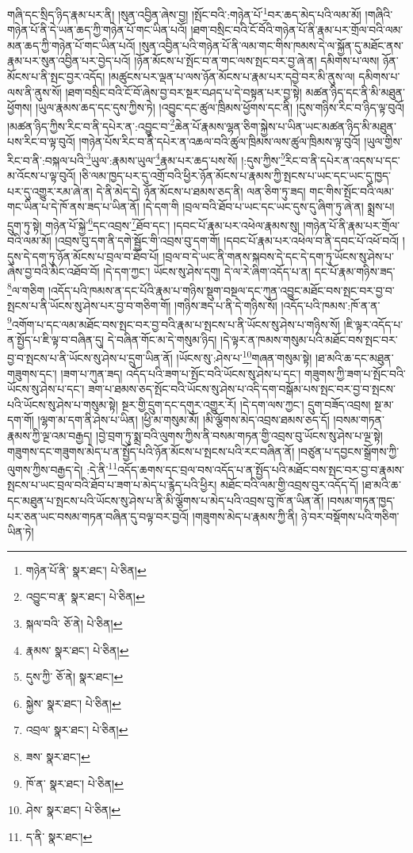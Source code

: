 གཞི་དང་སྲིད་ཉིད་རྣམ་པར་ནི། །སུན་འབྱིན་ཞེས་བྱ། །སྤོང་བའི་:གཉེན་པོ་\footnote{གཉེན་པོ་ནི་  སྣར་ཐང་།  པེ་ཅིན། }བར་ཆད་མེད་པའི་ལམ་མོ། །གཞིའི་གཉེན་པོ་ནི་དེ་ཡན་ཆད་ཀྱི་གཉེན་པོ་གང་ཡིན་པའོ། །ཐག་བསྲིང་བའི་ངོ་བོའི་གཉེན་པོ་ནི་རྣམ་པར་གྲོལ་བའི་ལམ་མན་ཆད་ཀྱི་གཉེན་པོ་གང་ཡིན་པའོ། །སུན་འབྱིན་པའི་གཉེན་པོ་ནི་ལམ་གང་གིས་ཁམས་དེ་ལ་སྐྱོན་དུ་མཐོང་ནས་རྣམ་པར་སུན་འབྱིན་པར་བྱེད་པའོ། །ཉོན་མོངས་པ་སྤོང་བ་ན་གང་ལས་སྤང་བར་བྱ་ཞེ་ན། དམིགས་པ་ལས། ཉོན་མོངས་པ་ནི་སྤང་བྱར་འདོད། །མཚུངས་པར་ལྡན་པ་ལས་ཉོན་མོངས་པ་རྣམ་པར་དབྱེ་བར་མི་ནུས་ལ། དམིགས་པ་ལས་ནི་ནུས་སོ། །ཐག་བསྲིང་བའི་ངོ་བོ་ཞེས་བྱ་བར་སྔར་བཤད་པ་དེ་བསྟན་པར་བྱ་སྟེ། མཚན་ཉིད་དང་ནི་མི་མཐུན་ཕྱོགས། །ཡུལ་རྣམས་ཆད་དང་དུས་ཀྱིས་ཏེ། །འབྱུང་དང་ཚུལ་ཁྲིམས་ཕྱོགས་དང་ནི། །དུས་གཉིས་རིང་བ་ཉིད་ལྟ་བུའོ། །མཚན་ཉིད་ཀྱིས་རིང་བ་ནི་དཔེར་ན་:འབྱུང་བ་\footnote{འབྱུང་བ་རྣ་  སྣར་ཐང་།  པེ་ཅིན། }ཆེན་པོ་རྣམས་ལྷན་ཅིག་སྐྱེས་པ་ཡིན་ཡང་མཚན་ཉིད་མི་མཐུན་པས་རིང་བ་ལྟ་བུའོ། །གཉེན་པོས་རིང་བ་ནི་དཔེར་ན་འཆལ་བའི་ཚུལ་ཁྲིམས་ལས་ཚུལ་ཁྲིམས་ལྟ་བུའོ། །ཡུལ་གྱིས་རིང་བ་ནི་:བསྐལ་པའི་\footnote{སྐལ་བའི་  ཅོ་ནེ།  པེ་ཅིན། }ཡུལ་:རྣམས་ཡུལ་\footnote{རྣམས་  སྣར་ཐང་།  པེ་ཅིན། }རྣམ་པར་ཆད་པས་སོ། །:དུས་ཀྱིས་\footnote{དུས་ཀྱི་  ཅོ་ནེ།  སྣར་ཐང་། }རིང་བ་ནི་དཔེར་ན་འདས་པ་དང་མ་འོངས་པ་ལྟ་བུའོ། །ཅི་ལམ་ཁྱད་པར་དུ་འགྲོ་བའི་ཕྱིར་ཉོན་མོངས་པ་རྣམས་ཀྱི་སྤངས་པ་ཡང་དང་ཡང་དུ་ཁྱད་པར་དུ་འགྱུར་རམ་ཞེ་ན། དེ་ནི་མེད་དེ། ཉོན་མོངས་པ་ཐམས་ཅད་ནི། ལན་ཅིག་ཏུ་ཟད། གང་གིས་སྤོང་བའི་ལམ་གང་ཡིན་པ་དེ་ཁོ་ནས་ཟད་པ་ཡིན་ནོ། །དེ་དག་གི །བྲལ་བའི་ཐོབ་པ་ཡང་དང་ཡང་དུས་དུ་ཞིག་ཏུ་ཞེ་ན། སྨྲས་པ། དྲུག་ཏུ་སྟེ། གཉེན་པོ་སྐྱེ་\footnote{སྐྱེས་  སྣར་ཐང་།  པེ་ཅིན། }དང་འབྲས་\footnote{འབྲལ་  སྣར་ཐང་།  པེ་ཅིན། }ཐོབ་དང་། །དབང་པོ་རྣམ་པར་འཕེལ་རྣམས་སུ། །གཉེན་པོ་ནི་རྣམ་པར་གྲོལ་བའི་ལམ་མོ། །འབྲས་བུ་དག་ནི་དགེ་སྦྱོང་གི་འབྲས་བུ་དག་གོ། །དབང་པོ་རྣམ་པར་འཕེལ་བ་ནི་དབང་པོ་འཕོ་བའོ། །དུས་དེ་དག་ཏུ་ཉོན་མོངས་པ་བྲལ་བ་ཐོབ་པོ། །བྲལ་བ་དེ་ཡང་ནི་གནས་སྐབས་དེ་དང་དེ་དག་ཏུ་ཡོངས་སུ་ཤེས་པ་ཞེས་བྱ་བའི་མིང་འཐོབ་བོ། །དེ་དག་ཀྱང་། ཡོངས་སུ་ཤེས་དགུ། དེ་ལ་རེ་ཞིག་འདོད་པ་ན། དང་པོ་རྣམ་གཉིས་ཟད་\footnote{ཟས་  སྣར་ཐང་། }ལ་གཅིག །འདོད་པའི་ཁམས་ན་དང་པོའི་རྣམ་པ་གཉིས་སྡུག་བསྔལ་དང་ཀུན་འབྱུང་མཐོང་བས་སྤང་བར་བྱ་བ་སྤངས་པ་ནི་ཡོངས་སུ་ཤེས་པར་བྱ་བ་གཅིག་གོ། །གཉིས་ཟད་པ་ནི་དེ་གཉིས་སོ། །འདོད་པའི་ཁམས་:ཁོ་ན་ན་\footnote{ཁོ་ན་  སྣར་ཐང་།  པེ་ཅིན། }འགོག་པ་དང་ལམ་མཐོང་བས་སྤང་བར་བྱ་བའི་རྣམ་པ་སྤངས་པ་ནི་ཡོངས་སུ་ཤེས་པ་གཉིས་སོ། །ཇི་ལྟར་འདོད་པ་ན་སྤྱོད་པ་ཇི་ལྟ་བ་བཞིན་དུ། དེ་བཞིན་གོང་མ་དེ་གསུམ་ཉིད། །དེ་ལྟར་ན་ཁམས་གསུམ་པའི་མཐོང་བས་སྤང་བར་བྱ་བ་སྤངས་པ་ནི་ཡོངས་སུ་ཤེས་པ་དྲུག་ཡིན་ནོ། །ཡོངས་སུ་:ཤེས་པ་\footnote{ཤེས་  སྣར་ཐང་།  པེ་ཅིན། }གཞན་གསུམ་སྟེ། །ཐ་མའི་ཆ་དང་མཐུན་གཟུགས་དང་། །ཟག་པ་ཀུན་ཟད། འདོད་པའི་ཟག་པ་སྤོང་བའི་ཡོངས་སུ་ཤེས་པ་དང་། གཟུགས་ཀྱི་ཟག་པ་སྤོང་བའི་ཡོངས་སུ་ཤེས་པ་དང་། ཟག་པ་ཐམས་ཅད་སྤོང་བའི་ཡོངས་སུ་ཤེས་པ་འདི་དག་བསྒོམ་པས་སྤང་བར་བྱ་བ་སྤངས་པའི་ཡོངས་སུ་ཤེས་པ་གསུམ་སྟེ། སྔར་གྱི་དྲུག་དང་དགུར་འགྱུར་རོ། །དེ་དག་ལས་ཀྱང་། དྲུག་བཟོད་འབྲས། སྔ་མ་དག་གོ། །ལྷག་མ་དག་ནི་ཤེས་པ་ཡིན། །ཕྱི་མ་གསུམ་མོ། །མི་ལྕོགས་མེད་འབྲས་ཐམས་ཅད་དོ། །བསམ་གཏན་རྣམས་ཀྱི་ལྔ་འམ་བརྒྱད། །བྱེ་བྲག་ཏུ་སྨྲ་བའི་ལུགས་ཀྱིས་ནི་བསམ་གཏན་གྱི་འབྲས་བུ་ཡོངས་སུ་ཤེས་པ་ལྔ་སྟེ། གཟུགས་དང་གཟུགས་མེད་པ་ན་སྤྱོད་པའི་ཉོན་མོངས་པ་སྤངས་པའི་རང་བཞིན་ནོ། །བཙུན་པ་དབྱངས་སྒྲོགས་ཀྱི་ལུགས་ཀྱིས་བརྒྱད་དེ། :དེ་ནི་\footnote{ད་ནི་  སྣར་ཐང་། }འདོད་ཆགས་དང་བྲལ་བས་འདོད་པ་ན་སྤྱོད་པའི་མཐོང་བས་སྤང་བར་བྱ་བ་རྣམས་སྤངས་པ་ཡང་བྲལ་བའི་ཐོབ་པ་ཟག་པ་མེད་པ་རྙེད་པའི་ཕྱིར། མཐོང་བའི་ལམ་གྱི་འབྲས་བུར་འདོད་དོ། །ཐ་མའི་ཆ་དང་མཐུན་པ་སྤངས་པའི་ཡོངས་སུ་ཤེས་པ་ནི་མི་ལྕོགས་པ་མེད་པའི་འབྲས་བུ་ཁོ་ན་ཡིན་ནོ། །བསམ་གཏན་ཁྱད་པར་ཅན་ཡང་བསམ་གཏན་བཞིན་དུ་བལྟ་བར་བྱའོ། །གཟུགས་མེད་པ་རྣམས་ཀྱི་ནི། ཉེ་བར་བསྡོགས་པའི་གཅིག་ཡིན་ཏེ། 